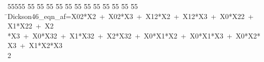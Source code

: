 %
%
\begin{tabbing}
55555 \= 55 \= 55 \= 55 \= 55 \= 55 \= 55 \= 55 \= 55 \= 55 \= 55 \= 55 \= 55 \= \>Dickson46\_eqn\_af=X02*X2\ +\ X02*X3\ +\ X12*X2\ +\ X12*X3\ +\ X0*X22\ +\ X1*X22\ +\ X2\\[0pt]
*X3\ +\ X0*X32\ +\ X1*X32\ +\ X2*X32\ +\ X0*X1*X2\ +\ X0*X1*X3\ +\ X0*X2*X3\ +\ X1*X2*X3\\[0pt]
2\>\end{tabbing}

